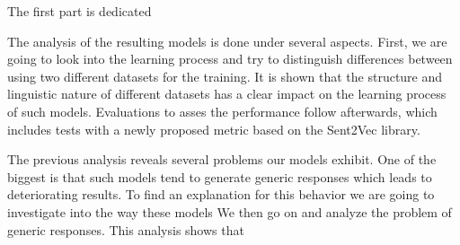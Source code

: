 The first part is dedicated

The analysis of the resulting models is done under several aspects. First, we are going to look into the learning process and try to distinguish differences between using two different datasets for the training. It is shown that the structure and linguistic nature of different datasets has a clear impact on the learning process of such models. Evaluations to asses the performance follow afterwards, which includes tests with a newly proposed metric based on the Sent2Vec library.

The previous analysis reveals several problems our models exhibit. One of the biggest is that such models tend to generate generic responses which leads to deteriorating results. To find an explanation for this behavior we are going to investigate into the way these models We then go on and analyze the problem of generic responses. This analysis shows that 